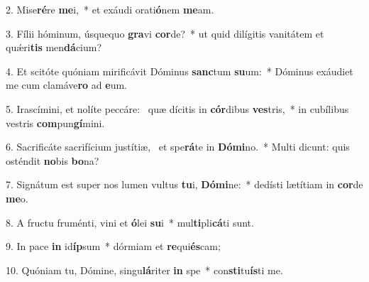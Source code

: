 2. Mise\textbf{ré}re \textbf{me}i,~*  et exáudi orati\textbf{ó}nem \textbf{me}am.\

3. Fílii hóminum, úsquequo \textbf{gra}vi \textbf{cor}de?~*  ut quid dilígitis vanitátem et quǽri\textbf{tis} men\textbf{dá}cium?\

4. Et scitóte quóniam mirificávit Dóminus \textbf{sanc}tum \textbf{su}um:~*  Dóminus exáudiet me cum clamáve\textbf{ro} ad \textbf{e}um.\

5. Irascímini, et nolíte peccáre: \dag\  quæ dícitis in \textbf{cór}dibus \textbf{ves}tris,~*  in cubílibus vestris \textbf{com}pun\textbf{gí}mini.\

6. Sacrificáte sacrifícium justítiæ, \dag\  et spe\textbf{rá}te in \textbf{Dó}\textbf{mi}no.~*  Multi dicunt: quis osténdit \textbf{no}bis \textbf{bo}na?\

7. Signátum est super nos lumen vultus \textbf{tu}i, \textbf{Dó}\textbf{mi}ne:~*  dedísti lætítiam in \textbf{cor}de \textbf{me}o.\

8. A fructu fruménti, vini et \textbf{ó}lei \textbf{su}i~*  mul\textbf{ti}pli\textbf{cá}ti sunt.\

9. In pace \textbf{in} id\textbf{íp}sum~*  dórmiam et \textbf{re}qui\textbf{és}cam;\

10. Quóniam tu, Dómine, singu\textbf{lá}riter \textbf{in} spe~*  con\textbf{sti}tu\textbf{ís}ti me.\

